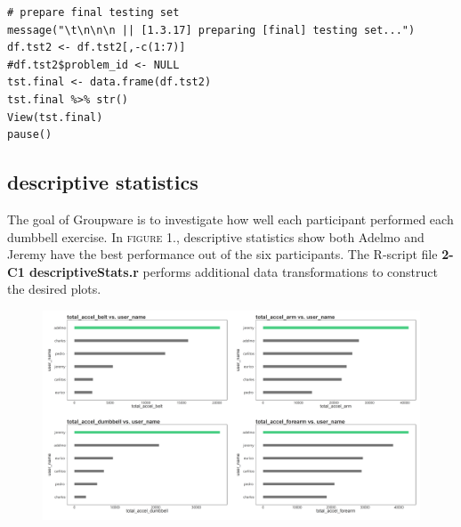 \documentclass[10pt, twoside]{article}
\begin{document}
\begin{verbatim}
# prepare final testing set
message("\t\n\n\n || [1.3.17] preparing [final] testing set...")
df.tst2 <- df.tst2[,-c(1:7)]
#df.tst2$problem_id <- NULL
tst.final <- data.frame(df.tst2)
tst.final %>% str()
View(tst.final)
pause()
\end{verbatim}

\begin{center}
\subsection{descriptive statistics}
\vspace{-3ex}
\end{center}

\noindent
The goal of Groupware is to investigate how well each participant performed each dumbbell
exercise. In \textsc{figure 1.}, descriptive statistics show both Adelmo and Jeremy have the best
performance out of the six participants. The R-script file \textbf{2-C1 descriptiveStats.r} performs
additional data transformations to construct the desired plots.
\bigskip

\begin{figure}[H]
\centering
\includegraphics[scale=0.359]{plot1}
\caption{}
\end{figure}
\end{document}
